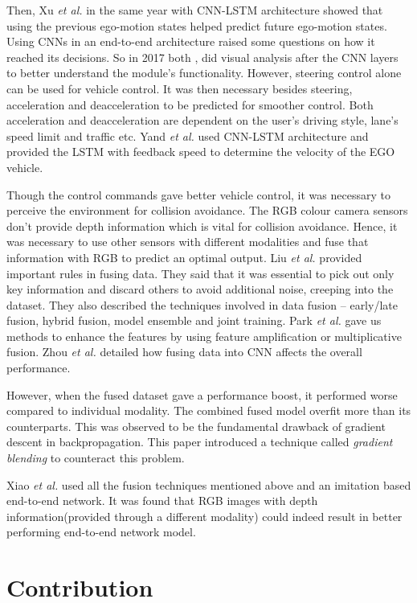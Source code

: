 Then, Xu \textit{et al.} \cite{XuGYD16CNNLSTM} in the same year with CNN-LSTM architecture
showed that using the previous ego-motion states helped predict future ego-motion states. 
Using CNNs in an end-to-end architecture raised some questions on how it reached its
decisions. So in 2017 both \cite{heatmapsLearning}, \cite{BojarskiCNN1} did visual
analysis after the CNN layers to better understand the module's functionality. 
However, steering control alone can be used for vehicle control. It was then necessary 
besides steering, acceleration and deacceleration to be predicted for smoother
control. Both acceleration and deacceleration are dependent on  the user's driving
style, lane's speed limit and traffic etc. Yand \textit{et
al.} \cite{E2EMultimodalDiscreteSpeed} used CNN-LSTM architecture and provided the LSTM
with feedback speed to determine the velocity of the EGO vehicle.

Though the control commands gave better vehicle control, it was necessary to perceive the
environment for collision avoidance. The RGB colour camera sensors don't provide depth information which is vital
for collision avoidance. Hence, it was necessary to use other sensors with different
modalities and fuse that information with RGB to predict an optimal output. Liu \textit{et
al.} \cite{liu2018learn} provided important rules in fusing data. They said that it was
essential to pick out only key information and discard others to avoid additional noise, creeping
into the dataset. They also described the techniques involved in data fusion -- early/late
fusion, hybrid fusion, model ensemble and joint training. Park \textit{et
al.} \cite{ParkHBB16} gave us methods to enhance the features by using feature amplification
or multiplicative fusion. Zhou \textit{et al.} \cite{ZhouSideChannel} detailed how fusing
data into CNN affects the overall performance.  

However, when the fused dataset gave a performance boost, it performed worse  
compared to individual modality. The combined fused model overfit more
than its counterparts. This was observed to be the fundamental drawback of
gradient descent in backpropagation. This paper \cite{wang2020makes} introduced a technique
called \textit{gradient blending} to counteract this problem.

Xiao \textit{et al.}\cite{XiaoCodevillaMultimodalE2E} used all the fusion techniques
mentioned above and  an imitation based end-to-end network\cite{codevilla2017endtoend}. It
was found that RGB images with depth information(provided through a different modality)
could indeed result in better performing end-to-end network model.


\section{Contribution}





